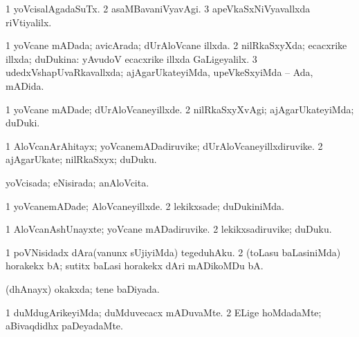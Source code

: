 {{\bentry
{} 
\gl{\nA}
\expl{}
\bmng
{} 
\emng
\eentry

\bentry
{} 
\gl{\kirxvi}
\expl{}
\bmng
\bnum
\num{1} yoVcisalAgadaSuTx. 
\num{2} asaMBavaniVyavAgi. 
\num{3} apeVkaSxNiVyavallxda riVtiyalilx. 
\enum
\emng
\eentry

\bentry
{} 
\gl{\gu}
\expl{}
\bmng
\bnum
\num{1} yoVcane mADada; avicArada; dUrAloVcane illxda. 
\num{2} nilRkaSxyXda; ecacxrike illxda; duDukina:  yAvudoV ecacxrike illxda GaLigeyalilx. 
\num{3} udedxVshapUvaRkavallxda; ajAgarUkateyiMda, upeVkeSxyiMda -- Ada, mADida. 
\enum
\emng
\eentry

\bentry
{} 
\gl{\kirxvi}
\expl{}
\bmng
\bnum
\num{1} yoVcane mADade; dUrAloVcaneyillxde. 
\num{2} nilRkaSxyXvAgi; ajAgarUkateyiMda; duDuki. 
\enum
\emng
\eentry

\bentry
{} 
\gl{\nA}
\expl{}
\bmng
\bnum
\num{1} AloVcanArAhitayx; yoVcanemADadiruvike; dUrAloVcaneyillxdiruvike. 
\num{2} ajAgarUkate; nilRkaSxyx; duDuku. 
\enum
\emng
\eentry

\bentry
{} 
\gl{\gu}
\expl{}
\bmng
yoVcisada; eNisirada; anAloVcita. 
\emng
\eentry

\bentry
{} 
\gl{\gu}
\expl{}
\bmng
{} 
\emng
\eentry

\bentry
{} 
\gl{\kirxvi}
\expl{}
\bmng
\bnum
\num{1} yoVcanemADade; AloVcaneyillxde. 
\num{2} lekikxsade; duDukiniMda. 
\enum
\emng
\eentry

\bentry
{} 
\gl{\nA}
\expl{}
\bmng
\bnum
\num{1} AloVcanAshUnayxte; yoVcane mADadiruvike. 
\num{2} lekikxsadiruvike; duDuku. 
\enum
\emng
\eentry

\bentry
{} 
\gl{\sakirx}
\expl{}
\bmng
\bnum
\num{1} poVNisidadx dAra(vanunx sUjiyiMda) tegeduhAku. 
\num{2} (toLasu baLasiniMda) horakekx bA; sutitx baLasi horakekx dAri mADikoMDu bA. 
\enum
\emng
\eentry

\bentry
{} 
\gl{\gu}
\expl{}
\bmng
(dhAnayx) okakxda; tene baDiyada. 
\emng
\eentry

\bentry
{} 
\gl{\kirxvi}
\bmng
\bnum
\num{1} duMdugArikeyiMda; duMduvecacx mADuvaMte. 
\num{2} ELige hoMdadaMte; aBivaqdidhx paDeyadaMte. 
\enum
\emng
\eentry

}}
